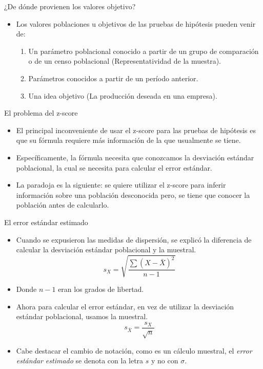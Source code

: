 \documentclass{beamer}
\begin{document}
\begin{frame}{¿De dónde provienen los valores objetivo?}
\begin{itemize}
\justifying
\item Los valores poblaciones u objetivos de las pruebas de hipótesis pueden venir de:
\begin{enumerate}
	\justifying
\item Un parámetro poblacional conocido a partir de un grupo de comparación o de un censo poblacional (Representatividad de la muestra).
\item Parámetros conocidos a partir de un período anterior.
\item Una idea objetivo (La producción deseada en una empresa).
\end{enumerate}
\end{itemize}
\end{frame}
\begin{frame}{El problema del z-score}
	\begin{itemize}
\justifying
\item El principal inconveniente de usar el z-score para las pruebas de hipótesis es que su fórmula requiere más información de la que usualmente se tiene.
\item Específicamente, la fórmula necesita que conozcamos la desviación estándar poblacional, la cual se necesita para calcular el error estándar. 
\item La paradoja es la siguiente: se quiere utilizar el z-score para inferir información sobre una población desconocida pero, se tiene que conocer la población antes de calcularlo.
	\end{itemize}
	
\end{frame}

\begin{frame}{El error estándar estimado}
	\begin{itemize}
		\justifying
		\item Cuando se expusieron las medidas de dispersión, se explicó la diferencia de calcular la desviación estándar poblacional y la muestral.
$$s_X=\sqrt{\dfrac{\sum{(X-\bar{X})^2}}{n-1}} $$

	\item Donde $n-1$ eran los grados de libertad.
	\item Ahora para calcular el error estándar, en vez de utilizar la desviación estándar poblacional, usamos la muestral.
	$$s_{\bar{X}}=\dfrac{s_X}{\sqrt{n}}$$
	\item Cabe destacar el cambio de notación, como es un cálculo muestral, el \emph{error estándar estimado} se denota con la letra $s$ y no con $\sigma$.
		\end{itemize}
	\end{frame}
	
\end{document}
